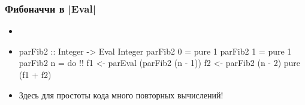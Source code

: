 \documentclass[11pt]{beamer}
\begin{document}
\begin{frame}[fragile]
  \frametitle{Фибоначчи в \haskinline|Eval|}
  \begin{itemize}
    \item
          \pause
    \item
          \begin{haskellsmall}
            parFib2 :: Integer -> Eval Integer
            parFib2 0 = pure 1
            parFib2 1 = pure 1
            parFib2 n = do !\pause!
              f1 <- parEval (parFib2 (n - 1))
              f2 <- parFib2 (n - 2)
              pure (f1 + f2)
          \end{haskellsmall}
          \pause
    \item Здесь для простоты кода много повторных вычислений!
  \end{itemize}
\end{frame}

\end{document}
